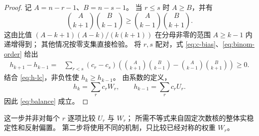 \documentclass[UTF8,a4paper,11pt,fontset=none]{ctexart}
\numberwithin{equation}{section}
\theoremstyle{paperplain}
\theoremstyle{definition}
\theoremstyle{remark}
\begin{document}
\begin{proof}
记 $A=n-r-1$、$B=n-s-1$。
当 $r\le s$ 时 $A\ge B$，并有
\begin{equation}\label{eq:binom-order}
\binom A{k+1}\binom B{k-1}
\ge\binom A{k-1}\binom B{k+1}.
\end{equation}
这由比值
$(A-k+1)(A-k)/(k(k+1))$ 在分母非零的范围 $A\ge k-1$ 内递增得到；
其他情况按零支集直接检验。
将 $r,s$ 配对，式 \eqref{eq:c-bias}、\eqref{eq:binom-order} 给出
\begin{align*}
h_{k+1}-h_{k-1}
={}&\sum_{r<s}(c_r-c_s)
\left(\binom A{k+1}\binom B{k-1}
-\binom A{k-1}\binom B{k+1}\right)\ge0.
\end{align*}
结合 \eqref{eq:h-lc}，非负性使 $h_k\ge h_{k-1}$。
由系数的定义，
\[
h_k=\sum_r c_rW_r,\qquad h_{k-1}=\sum_r c_rU_r.
\]
因此 \eqref{eq:balance} 成立。
\end{proof}

这一步并非对每个 $r$ 逐项比较 $U_r$ 与 $W_r$；
所需不等式来自固定次数核的整体实稳定性和反射偏置。
第二步将使用不同的机制，只比较已经对称的权重 $W_r$。
\end{document}
